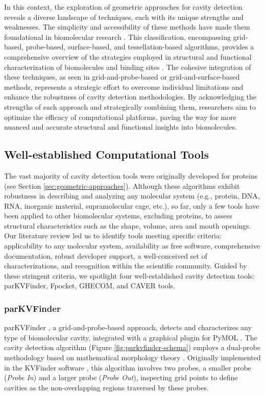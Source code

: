 \documentclass[Ingles]{phdthesis}
\def\eg{e.g.\onedot}
\begin{document}
In this context, the exploration of geometric approaches for cavity detection reveals a diverse landscape of techniques, each with its unique strengths and weaknesses. The simplicity and accessibility of these methods have made them foundational in biomolecular research \cite{henrich2010,simoes2017}. This classification, encompassing grid-based, probe-based, surface-based, and tessellation-based algorithms, provides a comprehensive overview of the strategies employed in structural and functional characterization of biomolecules and binding sites \cite{simoes2017}. The cohesive integration of these techniques, as seen in grid-and-probe-based or grid-and-surface-based methods, represents a strategic effort to overcome individual limitations and enhance the robustness of cavity detection methodologies. By acknowledging the strengths of each approach and strategically combining them, researchers aim to optimize the efficacy of computational platforms, paving the way for more nuanced and accurate structural and functional insights into biomolecules.

\subsection{Well-established Computational Tools \label{sec:computational-tools}}

The vast majority of cavity detection tools were originally developed for proteins (see Section \ref{sec:geometric-approaches}). Although these algorithms exhibit robustness in describing and analyzing any molecular system (\eg, protein, DNA, RNA, inorganic material, supramolecular cage, etc.), so far, only a few tools have been applied to other biomolecular systems, excluding proteins, to assess structural characteristics such as the shape, volume, area and mouth openings. Our literature review led us to identify tools meeting specific criteria: applicability to any molecular system, availability as free software, comprehensive documentation, robust developer support, a well-conceived set of characterizations, and recognition within the scientific community. Guided by these stringent criteria, we spotlight four well-established cavity detection tools: parKVFinder, Fpocket, GHECOM, and CAVER tools.

\subsubsection{parKVFinder}

parKVFinder \cite{guerra2019,guerra2020}, a grid-and-probe-based approach, detects and characterizes any type of biomolecular cavity, integrated with a graphical plugin for PyMOL \cite{pymol}. The cavity detection algorithm (Figure \ref{fig:parkvfinder-schema}) employs a dual-probe methodology based on mathematical morphology theory \cite{matheron1974,serra1982}. Originally implemented in the KVFinder software \cite{oliveira2014}, this algorithm involves two probes, a smaller probe (\textit{Probe In}) and a larger probe (\textit{Probe Out}), inspecting grid points to define cavities as the non-overlapping regions traversed by these probes.
\end{document}
